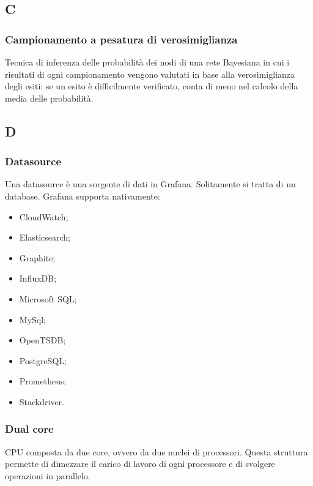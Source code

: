\appendix
{}
\subsection*{C}
\subsubsection*{Campionamento a pesatura di verosimiglianza}
\label{sec:campionamento}
Tecnica di inferenza delle probabilità dei nodi di una rete Bayesiana in cui i risultati di ogni campionamento vengono valutati in base alla verosimiglianza degli esiti: se un esito è difficilmente verificato, conta di meno nel calcolo della media delle probabilità.

\subsection*{D}

\subsubsection*{Datasource}
\label{sec:datasource} 
Una datasource è una sorgente di dati in Grafana. Solitamente si tratta di un database. Grafana supporta nativamente:
	\begin{itemize}
	\item CloudWatch;
	\item Elasticsearch;
	\item Graphite;
	\item InfluxDB;
	\item Microsoft SQL;
	\item MySql;
	\item OpenTSDB;
	\item PostgreSQL;
	\item Prometheus;
	\item Stackdriver.
	\end{itemize}

\subsubsection*{Dual core}
\label{sec:dualcore}
CPU composta da due core, ovvero da due nuclei di processori. Questa struttura permette di dimezzare il carico di lavoro di ogni processore e di svolgere operazioni in parallelo.

